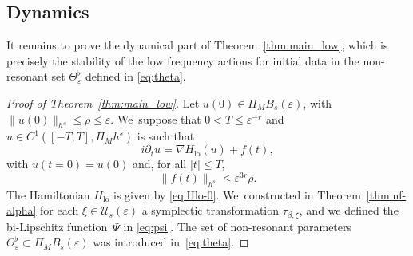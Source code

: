 \documentclass[10pt,a4paper]{amsart}
\theoremstyle{plain}
\theoremstyle{definition}
\DeclareMathOperator{\lo}{lo}
\newcommand{\1}{\mathbf{1}}
\let\epsilon\varepsilon
\begin{document}
\subsection{Dynamics}
\label{sec:dyn-low}
It remains to prove the dynamical part of Theorem~\ref{thm:main_low}, which is precisely the stability of the low frequency actions for initial data in the non-resonant set $\Theta_{\epsilon}^{\flat}$ defined in \eqref{eq:theta}.

\begin{proof}[Proof of Theorem~\ref{thm:main_low}] Let $u(0)\in\Pi_{M}B_{s}(\epsilon)$, with $\|u(0)\|_{h^{s}}\leq \rho \leq \epsilon$. We~suppose that $0<T\leq \epsilon^{-r}$ and $u\in C^{1}([-T,T],\Pi_{M}h^{s})$ is such that
\[
i\partial_{t}u = \nabla H_{\lo}(u) + f(t),
\]
with $u(t=0)=u(0)$ and, for all $|t|\leq T$,
\[
\|f(t)\|_{h^{s}}\leq \epsilon^{3r}\rho.
\]
The Hamiltonian $H_{\lo}$ is given by \eqref{eq:Hlo-0}. We~constructed in Theorem~\ref{thm:nf-alpha} for each $\xi\in\mathcal{U}_{s}(\epsilon)$ a symplectic transformation $\tau_{\beta,\xi}$, and we defined the bi-Lipschitz function~$\Psi$ in \eqref{eq:psi}. The set of non-resonant parameters $\Theta_{\epsilon}^{\flat}\subset \Pi_{M}B_{s}(\epsilon)$ was introduced in~\eqref{eq:theta}.


\end{proof}
\end{document}
